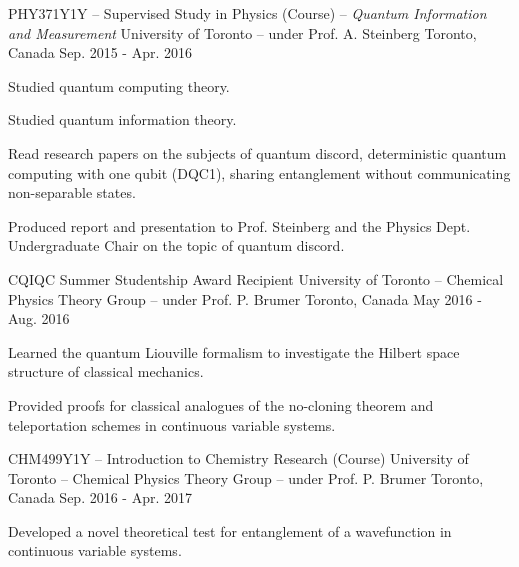 \begin{cventries}
  \cventry
    {PHY371Y1Y -- Supervised Study in Physics (Course) -- \emph{Quantum
        Information and Measurement}} %
    {University of Toronto -- under Prof. A. Steinberg} %
    {Toronto, Canada} %
    {Sep. 2015 - Apr. 2016} %
    {
      \begin{cvitems} %
      \item{Studied quantum computing theory.}
      \item{Studied quantum information theory.}
      \item{Read research papers on the subjects of quantum discord,
          deterministic quantum computing with one qubit (DQC1), sharing
          entanglement without communicating non-separable states.}
      \item{Produced report and presentation to Prof. Steinberg and the Physics
          Dept. Undergraduate Chair on the topic of quantum discord.}
      \end{cvitems}
    }

  \cventry
    {CQIQC Summer Studentship Award Recipient} %
    {University of Toronto -- Chemical Physics Theory Group -- under Prof. P. Brumer} %
    {Toronto, Canada} %
    {May 2016 - Aug. 2016} %
    {
      \begin{cvitems} %
        \item{Learned the quantum Liouville formalism to investigate the Hilbert
            space structure of classical mechanics.}
        \item{Provided proofs for classical analogues of the no-cloning theorem
            and teleportation schemes in continuous variable systems.}
      \end{cvitems}
    }

  \cventry
    {CHM499Y1Y -- Introduction to Chemistry Research (Course)} %
    {University of Toronto -- Chemical Physics Theory Group -- under Prof. P. Brumer} %
    {Toronto, Canada} %
    {Sep. 2016 - Apr. 2017} %
    {
      \begin{cvitems} %
        \item{Developed a novel theoretical test for entanglement of a
            wavefunction in continuous variable systems.}
      \end{cvitems}
    }


\end{cventries}
